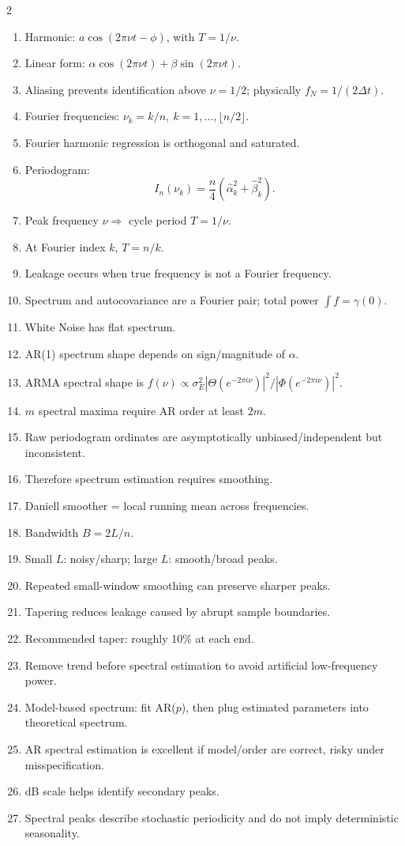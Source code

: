 \documentclass[9pt,a4paper]{extarticle}
\begin{document}
\begin{multicols}{2}
\begin{enumerate}
\item Harmonic: \(a\cos(2\pi\nu t-\phi)\), with \(T=1/\nu\).
\item Linear form: \(\alpha\cos(2\pi\nu t)+\beta\sin(2\pi\nu t)\).
\item Aliasing prevents identification above \(\nu=1/2\); physically \(f_N=1/(2\Delta t)\).
\item Fourier frequencies: \(\nu_k=k/n,\ k=1,\ldots,\lfloor n/2\rfloor\).
\item Fourier harmonic regression is orthogonal and saturated.
\item Periodogram:
\[
I_n(\nu_k)=\frac n4(\widehat\alpha_k^2+\widehat\beta_k^2).
\]
\item Peak frequency \(\nu\Rightarrow\) cycle period \(T=1/\nu\).
\item At Fourier index \(k\), \(T=n/k\).
\item Leakage occurs when true frequency is not a Fourier frequency.
\item Spectrum and autocovariance are a Fourier pair; total power \(\int f=\gamma(0)\).
\item White Noise has flat spectrum.
\item AR(1) spectrum shape depends on sign/magnitude of \(\alpha\).
\item ARMA spectral shape is \(f(\nu)\propto\sigma_E^2|\Theta(e^{-2\pi i\nu})|^2/|\Phi(e^{-2\pi i\nu})|^2\).
\item \(m\) spectral maxima require AR order at least \(2m\).
\item Raw periodogram ordinates are asymptotically unbiased/independent but inconsistent.
\item Therefore spectrum estimation requires smoothing.
\item Daniell smoother = local running mean across frequencies.
\item Bandwidth \(B=2L/n\).
\item Small \(L\): noisy/sharp; large \(L\): smooth/broad peaks.
\item Repeated small-window smoothing can preserve sharper peaks.
\item Tapering reduces leakage caused by abrupt sample boundaries.
\item Recommended taper: roughly 10\% at each end.
\item Remove trend before spectral estimation to avoid artificial low-frequency power.
\item Model-based spectrum: fit AR($p$), then plug estimated parameters into theoretical spectrum.
\item AR spectral estimation is excellent if model/order are correct, risky under misspecification.
\item dB scale helps identify secondary peaks.
\item Spectral peaks describe stochastic periodicity and do not imply deterministic seasonality.
\end{enumerate}


\end{multicols}
\end{document}
